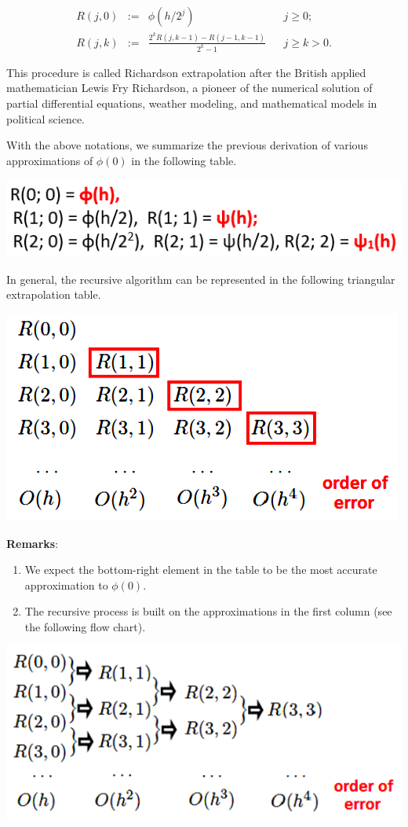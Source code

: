 \documentclass[
]{book}
\begin{document}
\[
\begin{array}{lclcl}
 R(j, 0) & := & \phi(h/2^j) &  & j \ge 0;  \\ 
 R(j, k) & := & \frac{2^kR(j, k-1)-R(j-1, k-1)}{2^k-1}  &   & j \ge k > 0.  
\end{array}
\]

This procedure is called Richardson extrapolation after the British applied mathematician Lewis Fry Richardson, a pioneer of the numerical solution of partial differential equations, weather modeling, and mathematical models in political science.

With the above notations, we summarize the previous derivation of various approximations of \(\phi(0)\) in the following table.

\begin{center}\includegraphics[width=0.45\linewidth]{img13/w13-RichardExampleSummary} \end{center}

In general, the recursive algorithm can be represented in the following triangular extrapolation table.

\begin{center}\includegraphics[width=0.45\linewidth]{img13/w13-RichardAlgorithm} \end{center}

\textbf{Remarks}:

\begin{enumerate}
\def\labelenumi{\arabic{enumi}.}
\item
  We expect the bottom-right element in the table to be the most accurate approximation to \(\phi(0)\).
\item
  The recursive process is built on the approximations in the first column (see the following flow chart).
\end{enumerate}

\begin{center}\includegraphics[width=0.45\linewidth]{img13/w13-RichardsonRecurssiveRelation} \end{center}
\end{document}
